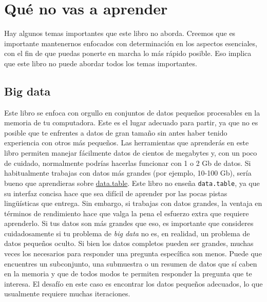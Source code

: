 \documentclass[11pt,oneside]{report}
\begin{document}
\hypertarget{quuxe9-no-vas-a-aprender}{%
\section{Qué no vas a aprender}\label{quuxe9-no-vas-a-aprender}}

Hay algunos temas importantes que este libro no aborda. Creemos que es
importante mantenernos enfocados con determinación en los aspectos
esenciales, con el fin de que puedas ponerte en marcha lo más rápido
posible. Eso implica que este libro no puede abordar todos los temas
importantes.

\hypertarget{big-data}{%
\subsection{Big data}\label{big-data}}

Este libro se enfoca con orgullo en conjuntos de datos pequeños
procesables en la memoria de tu computadora. Este es el lugar adecuado
para partir, ya que no es posible que te enfrentes a datos de gran
tamaño sin antes haber tenido experiencia con otros más pequeños. Las
herramientas que aprenderás en este libro permiten manejar fácilmente
datos de cientos de megabytes y, con un poco de cuidado, normalmente
podrías hacerlas funcionar con 1 o 2 Gb de datos. Si habitualmente
trabajas con datos más grandes (por ejemplo, 10-100 Gb), sería bueno que
aprendieras sobre
\href{https://github.com/Rdatatable/data.table}{data.table}. Este libro
no enseña \texttt{data.table}, ya que su interfaz concisa hace que sea
difícil de aprender por las pocas pistas lingüísticas que entrega. Sin
embargo, si trabajas con datos grandes, la ventaja en términos de
rendimiento hace que valga la pena el esfuerzo extra que requiere
aprenderlo. Si tus datos son más grandes que eso, es importante que
consideres cuidadosamente si tu problema de \emph{big data} no es, en
realidad, un problema de datos pequeños oculto. Si bien los datos
completos pueden ser grandes, muchas veces los necesarios para responder
una pregunta específica son menos. Puede que encuentres un subconjunto,
una submuestra o un resumen de datos que sí caben en la memoria y que de
todos modos te permiten responder la pregunta que te interesa. El
desafío en este caso es encontrar los datos pequeños adecuados, lo que
usualmente requiere muchas iteraciones.
\end{document}
